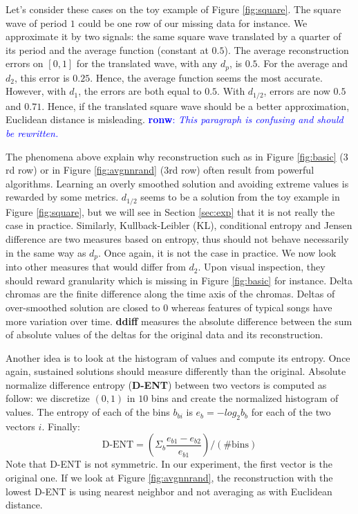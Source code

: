 \documentclass{article}
\newcommand{\FIXME}[2][FIXME]{\textcolor{blue}{\textbf{#1}: \emph{#2}}}
\begin{document}
Let's consider these cases on the toy example of Figure
\ref{fig:square}.  The square wave of period $1$ could be one row of
our missing data for instance.  We approximate it by two signals: the
same square wave translated by a quarter of its period and the average
function (constant at $0.5$). The average reconstruction errors on
$[0,1]$ for the translated wave, with any $d_p$, is $0.5$.  For the
average and $d_2$, this error is $0.25$.  Hence, the average function
seems the most accurate. However, with $d_1$, the errors are both
equal to $0.5$. With $d_{1/2}$, errors are now $0.5$ and
$0.71$. Hence, if the translated square wave should be a better
approximation, Euclidean distance is misleading.
\FIXME[ronw]{This paragraph is confusing and should be rewritten.}

The phenomena above explain why reconstruction such as in Figure
\ref{fig:basic} ($3$rd row) or in Figure \ref{fig:avgnnrand} ($3$rd
row) often result from powerful algorithms. Learning an overly
smoothed solution and avoiding extreme values is rewarded by some
metrics. $d_{1/2}$ seems to be a solution from the toy example in
Figure \ref{fig:square}, but we will see in Section \ref{sec:exp} that
it is not really the case in practice.  Similarly, Kullback-Leibler
(KL), conditional entropy and Jensen difference \cite{Michel1994} are
two measures based on entropy, thus should not behave necessarily in
the same way as $d_p$.  Once again, it is not the case in practice. We
now look into other measures that would differ from $d_2$.  Upon
visual inspection, they should reward granularity which is missing in
Figure \ref{fig:basic} for instance. Delta chromas are the finite
difference along the time axis of the chromas. Deltas of over-smoothed
solution are closed to $0$ whereas features of typical songs have more
variation over time.
\textbf{ddiff} measures the absolute difference between the
sum of absolute values of the deltas for the original data and its
reconstruction.

Another idea is to look at the histogram of values and compute its
entropy. Once again, sustained solutions should measure differently
than the original.  Absolute normalize difference entropy
(\textbf{D-ENT}) \cite{Mentzelopoulos2004} between two vectors is
computed as follow: we discretize $(0,1)$ in $10$ bins and create the
normalized histogram of values.  The entropy of each of the bins
$b_{bi}$ is $e_b = - log_2 b_b$ for each of the two vectors
$i$. Finally:
\[
\mbox{D-ENT} = \left( \Sigma_b \frac{e_{b1} - e_{b2}}{e_{b1}} \right) / (\mbox{\# bins})
\]
Note that D-ENT is not symmetric. In our experiment, the first vector
is the original one.  If we look at Figure \ref{fig:avgnnrand}, the
reconstruction with the lowest D-ENT is using nearest neighbor and not
averaging as with Euclidean distance.
\end{document}
